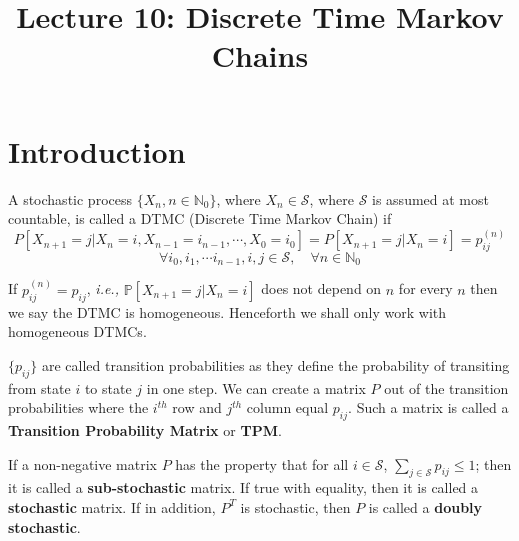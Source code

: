 \documentclass[a4paper,10pt,english]{article}
\title{ Lecture 10: Discrete Time Markov Chains}
\author{}
\begin{document}
\maketitle
\section{Introduction}
\begin{defn}[DTMC]
A stochastic process $\{X_n, n \in \mathbb{N}_0\}$, where $X_n \in \mathcal{S}$, where $\mathcal{S}$ is assumed at most countable, is called a DTMC (Discrete Time Markov Chain) if
\[P[X_{n+1} = j| X_n = i, X_{n-1} =i_{n-1}, \cdots, X_0 = i_0] = P[X_{n+1} = j|X_n = i] = p_{ij}^{(n)}\] 
\[\forall i_0, i_1,\cdots i_{n-1}, i,j \in \mathcal{S}, \quad \forall n \in \mathbb{N}_0\]
\end{defn}

If $p_{ij}^{(n)} = p_{ij}$, \textit{i.e.,} $\mathbb{P}[X_{n+1}=j|X_n=i]$ does not depend on $n$ for every $n$ then we say the DTMC is homogeneous. Henceforth we shall only work with homogeneous DTMCs. 

\begin{defn}
  $\{p_{ij}\}$ are called transition probabilities as they define the
  probability of transiting from state $i$ to state $j$ in one step.
  We can create a matrix $P$ out of the transition probabilities where
  the $i^{th}$ row and $j^{th}$ column equal $p_{ij}$. Such a matrix
  is called a \textbf{Transition Probability Matrix} or \textbf{TPM}.
\end{defn}
If a non-negative matrix $P$ has the property that for all $i \in \mathcal{S}$, $\sum_{j \in \mathcal{S}} p_{ij} \leq 1$; then it is called a \textbf{sub-stochastic} matrix. If true with equality, then it is called a \textbf{stochastic} matrix. If in addition, $P^T$ is stochastic, then $P$ is called a \textbf{doubly stochastic}.


\end{document}
